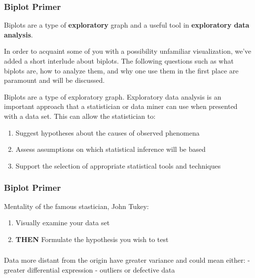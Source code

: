 \documentclass[serif]{beamer}
\begin{document}
	\begin{frame}
		\frametitle{Biplot Primer}

		Biplots are a type of {\bf exploratory} graph and a useful tool in {\bf exploratory data analysis}.

	\note
	{
		In order to acquaint some of you with a possibility unfamiliar visualization, we've added a short interlude 
		about  biplots. The following questions such as what biplots are, how to analyze them, and why one
		use them in the first place are paramount and will be discussed.\newline
		
		Biplots are a type of exploratory graph. Exploratory data analysis is an important approach
		that a statistician or data miner can use when presented with a data set. This can allow the
		statistician to:

		\begin{enumerate}
			\item Suggest hypotheses about the causes of observed phenomena
			\item Assess assumptions on which statistical inference will be based
			\item Support the selection of appropriate statistical tools and techniques
		\end{enumerate}

	}
	\end{frame}

%
%
%
%

	\begin{frame}
		\frametitle{Biplot Primer}
		Mentality of the famous stastician, John Tukey:
	
		\begin{enumerate}
			\item Visually examine your data set 
			\item {\bf THEN } Formulate the hypothesis you wish to test
		\end{enumerate}
	\end{frame}

	\begin{frame}
		\frametitle{}
		
		Data more distant from the origin have greater variance and could mean either:
		- greater differential expression
		- outliers or defective data
	
	\end{frame}
\end{document}
